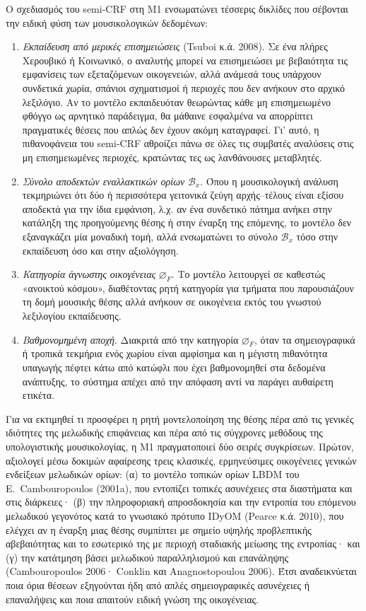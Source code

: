 \documentclass[11pt,a4paper]{article}
\begin{document}
Ο σχεδιασμός του semi-CRF στη Μ1 ενσωματώνει τέσσερις δικλίδες που σέβονται την ειδική φύση των μουσικολογικών δεδομένων:
\begin{enumerate}
\item \emph{Εκπαίδευση από μερικές επισημειώσεις} (Tsuboi κ.ά. 2008). Σε ένα πλήρες Χερουβικό ή Κοινωνικό, ο αναλυτής μπορεί να επισημειώσει με βεβαιότητα τις εμφανίσεις των εξεταζόμενων οικογενειών, αλλά ανάμεσά τους υπάρχουν συνδετικά χωρία, σπάνιοι σχηματισμοί ή περιοχές που δεν ανήκουν στο αρχικό λεξιλόγιο. Αν το μοντέλο εκπαιδευόταν θεωρώντας κάθε μη επισημειωμένο φθόγγο ως αρνητικό παράδειγμα, θα μάθαινε εσφαλμένα να απορρίπτει πραγματικές θέσεις που απλώς δεν έχουν ακόμη καταγραφεί. Γι' αυτό, η πιθανοφάνεια του semi-CRF αθροίζει πάνω σε όλες τις συμβατές αναλύσεις στις μη επισημειωμένες περιοχές, κρατώντας τες ως λανθάνουσες μεταβλητές.
\item \emph{Σύνολο αποδεκτών εναλλακτικών ορίων} $\mathcal B_x$. Όπου η μουσικολογική ανάλυση τεκμηριώνει ότι δύο ή περισσότερα γειτονικά ζεύγη αρχής--τέλους είναι εξίσου αποδεκτά για την ίδια εμφάνιση, λ.χ. αν ένα συνδετικό πάτημα ανήκει στην κατάληξη της προηγούμενης θέσης ή στην έναρξη της επόμενης, το μοντέλο δεν εξαναγκάζει μία μοναδική τομή, αλλά ενσωματώνει το σύνολο $\mathcal B_x$ τόσο στην εκπαίδευση όσο και στην αξιολόγηση.
\item \emph{Κατηγορία άγνωστης οικογένειας} $\varnothing_F$. Το μοντέλο λειτουργεί σε καθεστώς «ανοικτού κόσμου», διαθέτοντας ρητή κατηγορία για τμήματα που παρουσιάζουν τη δομή μουσικής θέσης αλλά ανήκουν σε οικογένεια εκτός του γνωστού λεξιλογίου εκπαίδευσης.
\item \emph{Βαθμονομημένη αποχή}. Διακριτά από την κατηγορία $\varnothing_F$, όταν τα σημειογραφικά ή τροπικά τεκμήρια ενός χωρίου είναι αμφίσημα και η μέγιστη πιθανότητα υπαγωγής πέφτει κάτω από κατώφλι που έχει βαθμονομηθεί στα δεδομένα ανάπτυξης, το σύστημα απέχει από την απόφαση αντί να παράγει αυθαίρετη ετικέτα.
\end{enumerate}

Για να εκτιμηθεί τι προσφέρει η ρητή μοντελοποίηση της θέσης πέρα από τις γενικές ιδιότητες της μελωδικής επιφάνειας και πέρα από τις σύγχρονες μεθόδους της υπολογιστικής μουσικολογίας, η Μ1 πραγματοποιεί δύο σειρές συγκρίσεων. Πρώτον, αξιολογεί μέσω δοκιμών αφαίρεσης τρεις κλασικές, ερμηνεύσιμες οικογένειες γενικών ενδείξεων μελωδικών ορίων: (α) το μοντέλο τοπικών ορίων LBDM του E.~Cambouropoulos (2001a), που εντοπίζει τοπικές ασυνέχειες στα διαστήματα και στις διάρκειες· (β) την πληροφοριακή απροσδοκησία και την εντροπία του επόμενου μελωδικού γεγονότος κατά το γνωσιακό πρότυπο IDyOM (Pearce κ.ά. 2010), που ελέγχει αν η έναρξη μιας θέσης συμπίπτει με σημείο υψηλής προβλεπτικής αβεβαιότητας και το εσωτερικό της με περιοχή σταδιακής μείωσης της εντροπίας· και (γ) την κατάτμηση βάσει μελωδικού παραλληλισμού και επανάληψης (Cambouropoulos 2006· Conklin και Anagnostopoulou 2006). Έτσι αναδεικνύεται ποια όρια θέσεων εξηγούνται ήδη από απλές σημειογραφικές ασυνέχειες ή επαναλήψεις και ποια απαιτούν ειδική γνώση της οικογένειας.
\end{document}
